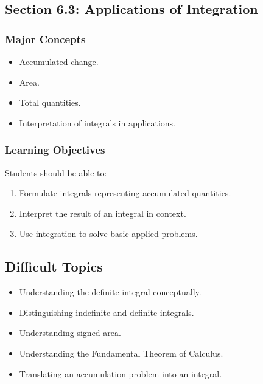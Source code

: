 \documentclass[11pt]{article}
\begin{document}
\subsection{Section 6.3: Applications of Integration}

\subsubsection{Major Concepts}

\begin{itemize}
    \item Accumulated change.
    \item Area.
    \item Total quantities.
    \item Interpretation of integrals in applications.
\end{itemize}

\subsubsection{Learning Objectives}

Students should be able to:

\begin{enumerate}
    \item Formulate integrals representing accumulated quantities.
    \item Interpret the result of an integral in context.
    \item Use integration to solve basic applied problems.
\end{enumerate}

\subsection{Difficult Topics}

\begin{itemize}
    \item Understanding the definite integral conceptually.
    \item Distinguishing indefinite and definite integrals.
    \item Understanding signed area.
    \item Understanding the Fundamental Theorem of Calculus.
    \item Translating an accumulation problem into an integral.
\end{itemize}

\end{document}
